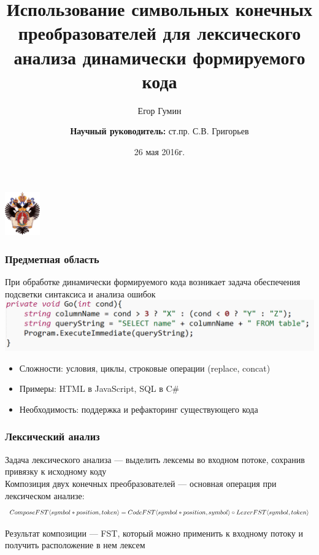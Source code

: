 \documentclass{beamer}
\title[]{Использование символьных конечных
преобразователей для лексического анализа динамически формируемого кода}
\institute[СПбГУ]{
Санкт-Петербургский государственный университет \\
Кафедра системного программирования }
\author[Егор Гумин]{Егор Гумин \\
  \and  
    {\bfseries Научный руководитель:} ст.пр. С.В. Григорьев \\ 
  \and
    }
\date{26 мая 2016г.}
\begin{document}
{
\begin{frame}
  \begin{center}
  {\includegraphics[width=1.5cm]{../pictures/SPbGU_Logo.png}}
  \end{center}
  \titlepage
\end{frame}
}

\begin{frame}[fragile]
  \transwipe[direction=90]
  \frametitle{Предметная область}
  \textbf{}При обработке динамически формируемого кода возникает задача обеспечения подсветки синтаксиса и анализа ошибок\\
  \vspace{5mm}
  {\includegraphics[width=1\linewidth]{../pictures/sql.PNG}}
  \begin{itemize}
    \item Сложности: условия, циклы, строковые операции (replace, concat)
    \item Примеры: HTML в JavaScript, SQL в C\#
    \item Необходимость: поддержка и рефакторинг существующего кода
  \end{itemize}
\end{frame}

\begin{frame}[fragile]
  \transwipe[direction=90]
  \frametitle{Лексический анализ}
  \textbf{}Задача лексического анализа — выделить лексемы во входном потоке, сохранив привязку к исходному коду \\
  \vspace{5mm}
  \textbf{}Композиция двух конечных преобразователей — основная операция при лексическом анализе: \\
    $$ComposeFST \langle symbol*position, token \rangle = \\ CodeFST\langle symbol*position, symbol\rangle \circ LexerFST \langle symbol, token\rangle$$

  \vspace{5mm}
  {}Результат композиции — FST, который можно применить к входному потоку и получить расположение в нем лексем
\end{frame}
\end{document}
